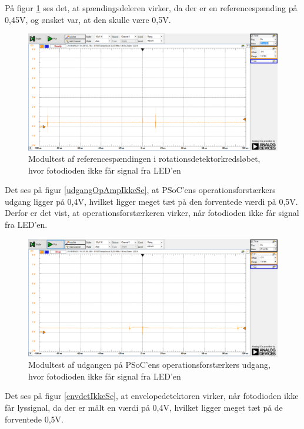 På figur \ref{fig:spaendIkkeSe} ses det, at spændingsdeleren virker, da der er en referencespænding på 0,45V, og ønsket var, at den skulle være 0,5V. 

\begin{figure}[H]
	\centering
	\includegraphics[width=\textwidth]{Test/images/AffyringTest/IkkeSe/spaendingsdeler}
	\caption{Modultest af referencespændingen i rotationsdetektorkredsløbet, hvor fotodioden ikke får signal fra LED'en}
	\label{fig:spaendIkkeSe}
\end{figure}

Det ses på figur \ref{udgangOpAmpIkkeSe}, at PSoC'ens operationsforstærkers udgang ligger på 0,4V, hvilket ligger meget tæt på den forventede værdi på 0,5V. Derfor er det vist, at operationsforstærkeren virker, når fotodioden ikke får signal fra LED'en. 

\begin{figure}[H]
	\centering
	\includegraphics[width=\textwidth]{Test/images/AffyringTest/IkkeSe/udgang_opamp_psoc}
	\caption{Modultest af udgangen på PSoC'ens operationsforstærkers udgang, hvor fotodioden ikke får signal fra LED'en}
	\label{fig:udgangOpAmpIkkeSe}
\end{figure}

Det ses på figur \ref{envdetIkkeSe}, at envelopedetektoren virker, når fotodioden ikke får lyssignal, da der er målt en værdi på 0,4V, hvilket ligger meget tæt på de forventede 0,5V. 

